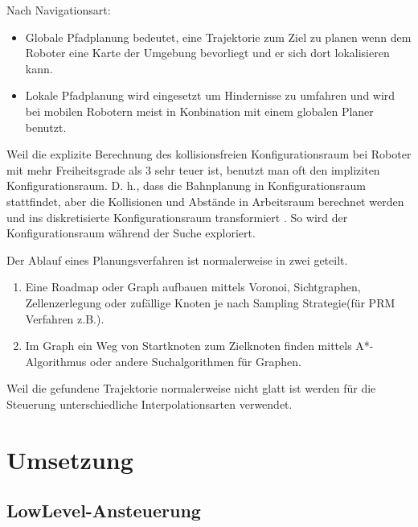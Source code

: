 Nach Navigationsart:
\begin{itemize}
\item Globale Pfadplanung bedeutet, eine Trajektorie zum Ziel zu planen wenn dem Roboter eine Karte der Umgebung bevorliegt und er sich dort lokalisieren kann.
\item Lokale Pfadplanung wird eingesetzt um Hindernisse zu umfahren und wird bei mobilen Robotern meist in Konbination mit einem globalen Planer benutzt. 
\end{itemize}

Weil die explizite Berechnung des kollisionsfreien \gls{Konfigurationsraum} bei Roboter mit mehr Freiheitsgrade als 3 sehr teuer ist, benutzt man oft den impliziten Konfigurationsraum. D. h., dass die Bahnplanung in \gls{Konfigurationsraum} stattfindet, aber die Kollisionen und Abstände in Arbeitsraum berechnet werden und ins diskretisierte Konfigurationsraum transformiert \citep{innoKonz}. So wird der Konfigurationsraum während der Suche exploriert.

Der Ablauf eines Planungsverfahren ist normalerweise in zwei geteilt.
\begin{enumerate}
\item Eine Roadmap oder Graph aufbauen mittels \gls{Voronoi}, \gls{Sichtgraphen}, \gls{Zellenzerlegung} oder zufällige Knoten je nach Sampling Strategie(für \gls{PRM} Verfahren z.B.).
\item Im Graph ein Weg von Startknoten zum Zielknoten finden mittels A*-Algorithmus oder andere Suchalgorithmen für Graphen.
\end{enumerate}

Weil die gefundene Trajektorie normalerweise nicht glatt ist werden für die Steuerung unterschiedliche Interpolationsarten verwendet.



\section{Umsetzung}
\label{bahnplanung_umsetzung_sec}


\subsection{LowLevel-Ansteuerung}
\label{bahnplanung_lowlevel_subsec}
\authorsection{\editoroier}

